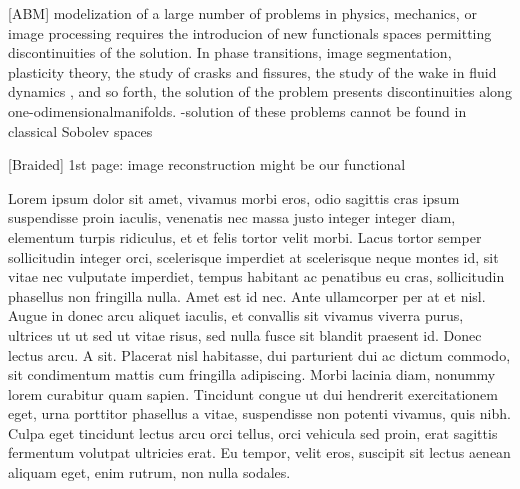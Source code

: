 [ABM] modelization of a large number of problems in physics, mechanics, or image
processing requires the introducion of new functionals spaces permitting
discontinuities of the solution. In phase transitions, image segmentation,
plasticity theory, the study of crasks and fissures, the study of the wake in
fluid dynamics , and so forth, the solution of the problem presents
discontinuities along one-odimensionalmanifolds.
-solution of these problems cannot be found in classical Sobolev spaces

[Braided] 1st page: image reconstruction might be our functional



\begin{remark}
 Lorem ipsum dolor sit amet, vivamus morbi eros, odio sagittis cras ipsum
 suspendisse proin iaculis, venenatis nec massa justo integer integer diam,
 elementum turpis ridiculus, et et felis tortor velit morbi. Lacus tortor
 semper sollicitudin integer orci, scelerisque imperdiet at scelerisque neque
 montes id, sit vitae nec vulputate imperdiet, tempus habitant ac penatibus eu
 cras, sollicitudin phasellus non fringilla nulla. Amet est id nec. Ante
 ullamcorper per at et nisl. Augue in donec arcu aliquet iaculis, et convallis
 sit vivamus viverra purus, ultrices ut ut sed ut vitae risus, sed nulla fusce
 sit blandit praesent id. Donec lectus arcu. A sit. Placerat nisl habitasse,
 dui parturient dui ac dictum commodo, sit condimentum mattis cum fringilla
 adipiscing. Morbi lacinia diam, nonummy lorem curabitur quam sapien. Tincidunt
 congue ut dui hendrerit exercitationem eget, urna porttitor phasellus a vitae,
 suspendisse non potenti vivamus, quis nibh. Culpa eget tincidunt lectus arcu
 orci tellus, orci vehicula sed proin, erat sagittis fermentum volutpat
 ultricies erat. Eu tempor, velit eros, suscipit sit lectus aenean aliquam
 eget, enim rutrum, non nulla sodales.




\end{remark}

